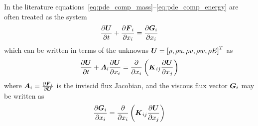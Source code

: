\documentclass[compress,11pt]{beamer}
\begin{document}
\frame
{
  In the literature equations~\eqref{eq:pde_comp_mass}--\eqref{eq:pde_comp_energy} are often treated as the system%
  \begin{equation}
    \label{eq:pde_comp}
    {\frac{\partial{{\boldsymbol{U}}}}{\partial{t}}} + {\frac{\partial{{\boldsymbol{F}}_i}}{\partial{x_i}}} = {\frac{\partial{{\boldsymbol{G}}_i}}{\partial{x_i}}}
  \end{equation}
  which can be written in terms of the unknowns ${\boldsymbol{U}}=\left[\rho, \rho u, \rho v, \rho w, \rho E\right]^T$ as
  \begin{equation}
    \label{eq:pde_comp2}
    {\frac{\partial{{\boldsymbol{U}}}}{\partial{t}}} + {\boldsymbol{A}}_i {\frac{\partial{{\boldsymbol{U}}}}{\partial{x_i}}} =
    {\frac{\partial{}}{\partial{x_i}}} \left( {\boldsymbol{K}}_{ij} {\frac{\partial{{\boldsymbol{U}}}}{\partial{x_j}}} \right)
  \end{equation}
  where ${\boldsymbol{A}}_i = {\frac{\partial{{\boldsymbol{F}}_i}}{\partial{{\boldsymbol{U}}}}}$ is the inviscid flux Jacobian, and the viscous flux vector ${\boldsymbol{G}}_i$ may be written as
  \begin{equation}
    \label{eq:viscous_flux_jacobian}
    {\frac{\partial{{\boldsymbol{G}}_i}}{\partial{x_i}}} = {\frac{\partial{}}{\partial{x_i}}} \left( {\boldsymbol{K}}_{ij} {\frac{\partial{{\boldsymbol{U}}}}{\partial{x_j}}} \right)
  \end{equation}
  \normalsize
}


\end{document}

